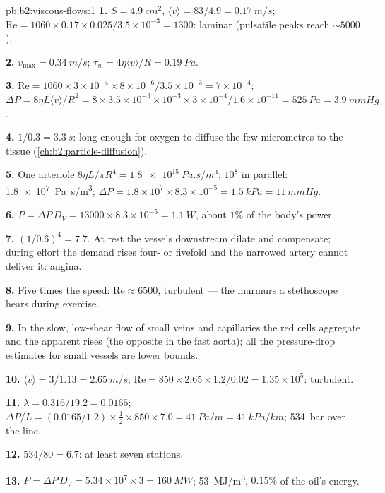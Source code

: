 \begin{solution}{pb:b2:viscous-flows:1}
\textbf{1.} $S = \qty{4.9}{cm^2}$, $\langle v\rangle = 83/4.9 = \qty{0.17}{m/s}$; $\mathrm{Re}
= 1060 \times 0.17 \times 0.025/3.5 \times 10^{-3} = 1300$: laminar (pulsatile peaks
reach $\sim 5000$).

\textbf{2.} $v_{\max} = \qty{0.34}{m/s}$; $\tau_w = 4\eta\langle v\rangle/R = \qty{0.19}{Pa}$.

\textbf{3.} $\mathrm{Re} = 1060 \times 3 \times 10^{-4} \times 8 \times 10^{-6}/3.5 \times 10^{-3} =
7 \times 10^{-4}$; $\Delta P = 8\eta L\langle v\rangle/R^2 = 8 \times 3.5 \times 10^{-3} \times 10^{-3}
\times 3 \times 10^{-4}/1.6 \times 10^{-11} = \qty{525}{Pa} = \qty{3.9}{mmHg}$.

\textbf{4.} $1/0.3 = \qty{3.3}{s}$: long enough for oxygen to diffuse the few
micrometres to the tissue (\cref{ch:b2:particle-diffusion}).

\textbf{5.} One arteriole $8\eta L/\pi R^4 = \qty{1.8e15}{Pa.s/m^3}$; $10^8$ in
parallel: \qty{1.8e7}{Pa.s/m^3}; $\Delta P = 1.8 \times 10^7 \times 8.3 \times 10^{-5} =
\qty{1.5}{kPa} = \qty{11}{mmHg}$.

\textbf{6.} $P = \Delta P\,D_V = 13000 \times 8.3 \times 10^{-5} = \qty{1.1}{W}$, about
$1\%$ of the body's power.

\textbf{7.} $(1/0.6)^4 = 7.7$. At rest the vessels downstream dilate and
compensate; during effort the demand rises four- or fivefold and the
narrowed artery cannot deliver it: angina.

\textbf{8.} Five times the speed: $\mathrm{Re} \approx 6500$, turbulent --- the
murmurs a stethoscope hears during exercise.

\textbf{9.} In the slow, low-shear flow of small veins and capillaries
the red cells aggregate and the apparent  rises (the opposite
in the fast aorta); all the pressure-drop estimates for small vessels
are lower bounds.

\textbf{10.} $\langle v\rangle = 3/1.13 = \qty{2.65}{m/s}$; $\mathrm{Re} = 850 \times 2.65 \times
1.2/0.02 = 1.35 \times 10^5$: turbulent.

\textbf{11.} $\lambda = 0.316/19.2 = 0.0165$; $\Delta P/L = (0.0165/1.2) \times \tfrac12 \times
850 \times 7.0 = \qty{41}{Pa/m} = \qty{41}{kPa/km}$; \qty{534}{bar} over the line.

\textbf{12.} $534/80 = 6.7$: at least seven stations.

\textbf{13.} $P = \Delta P\,D_V = 5.34 \times 10^7 \times 3 = \qty{160}{MW}$;
\qty{53}{MJ/m^3}, $0.15\%$ of the oil's energy.


\end{solution}
